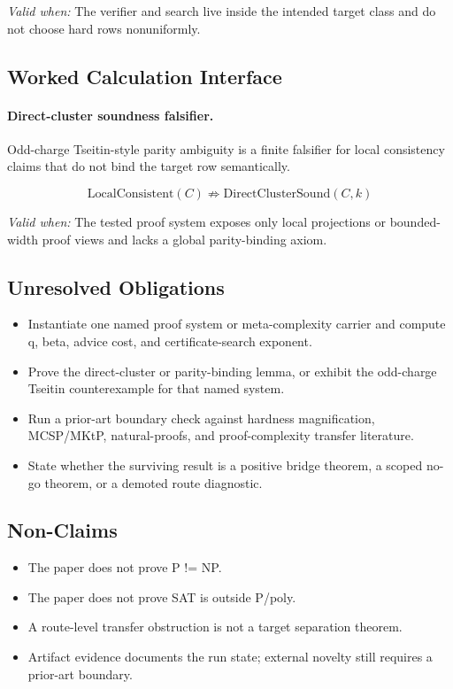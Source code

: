\emph{Valid when:} The verifier and search live inside the intended target class and do not choose hard rows nonuniformly.

\subsection{Worked Calculation Interface}

\paragraph{Direct-cluster soundness falsifier.} Odd-charge Tseitin-style parity ambiguity is a finite falsifier for local consistency claims that do not bind the target row semantically.

\[
\mathrm{LocalConsistent}(C)\not\Rightarrow \mathrm{DirectClusterSound}(C,k)
\]

\emph{Valid when:} The tested proof system exposes only local projections or bounded-width proof views and lacks a global parity-binding axiom.

\subsection{Unresolved Obligations}

\begin{itemize}
\item Instantiate one named proof system or meta-complexity carrier and compute q, beta, advice cost, and certificate-search exponent.
\item Prove the direct-cluster or parity-binding lemma, or exhibit the odd-charge Tseitin counterexample for that named system.
\item Run a prior-art boundary check against hardness magnification, MCSP/MKtP, natural-proofs, and proof-complexity transfer literature.
\item State whether the surviving result is a positive bridge theorem, a scoped no-go theorem, or a demoted route diagnostic.
\end{itemize}

\subsection{Non-Claims}

\begin{itemize}
\item The paper does not prove P != NP.
\item The paper does not prove SAT is outside P/poly.
\item A route-level transfer obstruction is not a target separation theorem.
\item Artifact evidence documents the run state; external novelty still requires a prior-art boundary.
\end{itemize}
